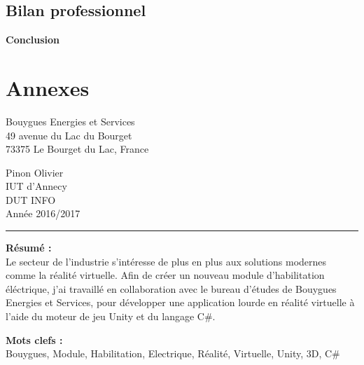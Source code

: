 \documentclass[a4paper]{article}
\begin{document}
    \subsection{Bilan professionnel}

    \huge \textbf{Conclusion} \vspace{5pt} \\
   
    \section{Annexes}
    
    \newpage 
    \pagestyle{empty}
    
    \normalsize
    \noindent
    \begin{minipage}{.5\textwidth}
        Bouygues Energies et Services \\
        49 avenue du Lac du Bourget \\
        73375 Le Bourget du Lac, France
    \end{minipage}
    \begin{minipage}{.5\textwidth}
    \begin{flushright}
        Pinon Olivier \\
        IUT d'Annecy \\
        DUT INFO \\
        Année 2016/2017 \\
    \end{flushright}
    \end{minipage}

    \vspace{10pt}
    \noindent\rule{0.725\paperwidth}{0.4pt}
    
    \vfill 
    \begin{flushleft}
    \huge \textbf{Résumé : } \\
    \vspace{10pt}
    \normalsize Le secteur de l'industrie s'intéresse de plus en plus aux solutions modernes comme la réalité virtuelle. Afin de créer un nouveau module d'habilitation éléctrique, j'ai travaillé en collaboration avec le bureau d'études de Bouygues Energies et Services, pour développer une application lourde en réalité virtuelle à l'aide du moteur de jeu Unity et du langage C\#. \\
    \end{flushleft}
    
    \vfill 
    \begin{flushleft}
    \huge \textbf{Mots clefs : } \vspace{2pt} \\
    \vspace{10pt}
    \normalsize Bouygues, Module, Habilitation, Electrique, Réalité, Virtuelle, Unity, 3D, C\#
    \end{flushleft}
\end{document}
